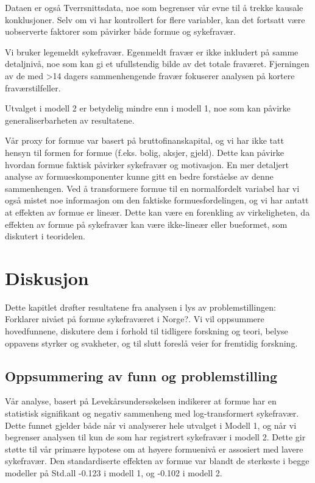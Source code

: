 \documentclass[
  12pt,
  a4paper,
  DIV=11,
  numbers=noendperiod]{scrartcl}
\begin{document}
Dataen er også Tverrsnittsdata, noe som begrenser vår evne til å trekke
kausale konklusjoner. Selv om vi har kontrollert for flere variabler,
kan det fortsatt være uobserverte faktorer som påvirker både formue og
sykefravær.

Vi bruker legemeldt sykefravær. Egenmeldt fravær er ikke inkludert på
samme detaljnivå, noe som kan gi et ufullstendig bilde av det totale
fraværet. Fjerningen av de med \textgreater14 dagers sammenhengende
fravær fokuserer analysen på kortere fraværstilfeller.

Utvalget i modell 2 er betydelig mindre enn i modell 1, noe som kan
påvirke generaliserbarheten av resultatene.

Vår proxy for formue var basert på bruttofinanskapital, og vi har ikke
tatt hensyn til formen for formue (f.eks. bolig, aksjer, gjeld). Dette
kan påvirke hvordan formue faktisk påvirker sykefravær og motivasjon. En
mer detaljert analyse av formueskomponenter kunne gitt en bedre
forståelse av denne sammenhengen. Ved å transformere formue til en
normalfordelt variabel har vi også mistet noe informasjon om den
faktiske formuesfordelingen, og vi har antatt at effekten av formue er
lineær. Dette kan være en forenkling av virkeligheten, da effekten av
formue på sykefravær kan være ikke-lineær eller bueformet, som diskutert
i teoridelen.

\newpage

\section{Diskusjon}\label{sec-diskusjon}

Dette kapitlet drøfter resultatene fra analysen i lys av
problemstillingen: Forklarer nivået på formue sykefraværet i Norge?. Vi
vil oppsummere hovedfunnene, diskutere dem i forhold til tidligere
forskning og teori, belyse oppavens styrker og svakheter, og til slutt
foreslå veier for fremtidig forskning.

\subsection{Oppsummering av funn og
problemstilling}\label{oppsummering-av-funn-og-problemstilling}

Vår analyse, basert på Levekårsundersøkelsen indikerer at formue har en
statistisk signifikant og negativ sammenheng med log-transformert
sykefravær. Dette funnet gjelder både når vi analyserer hele utvalget i
Modell 1, og når vi begrenser analysen til kun de som har registrert
sykefravær i modell 2. Dette gir støtte til vår primære hypotese om at
høyere formuenivå er assosiert med lavere sykefravær. Den standardiserte
effekten av formue var blandt de sterkeste i begge modeller på Std.all
-0.123 i modell 1, og -0.102 i modell 2.
\end{document}
